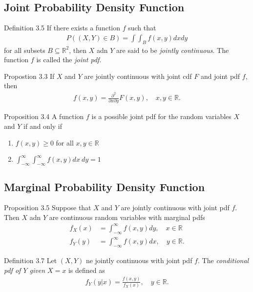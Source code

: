\subsection{Joint Probability Density Function}
\begin{boks}{Definition 3.5}
If there exists a function $f$ such that
\begin{align*}
    P((X, Y)\in B) = \int\int_B f(x, y) dx dy
\end{align*}
for all subsets $B\subseteq \mathbb{R}^2$, then $X$ adn $Y$ are said to be \textit{jointly continuous}. The function $f$ is called the \textit{joint pdf}.
\end{boks}

\begin{boks}{Propostion 3.3}
If $X$ and $Y$ are jointly continuous with joint cdf $F$ and joint pdf $f$, then
\begin{align*}
    f(x, y) = \frac{\partial^2}{\partial x \partial y} F(x,y), \quad x,y \in \mathbb{R}.
\end{align*}
\end{boks}

\begin{boks}{Proposition 3.4}
A function $f$ is a possible joint pdf for the random variables $X$ and $Y$ if and only if
\begin{enumerate}
    \item $f(x, y) \geq 0$ for all $x,y \in \mathbb{R}$
    \item $\int_{-\infty}^\infty \int_{-\infty}^\infty f(x,y)dx\  dy = 1$
\end{enumerate}
\end{boks}
\newpage
\subsection{Marginal Probability Density Function}

\begin{boks}{Proposition 3.5}
Suppose that $X$ and $Y$ are jointly continuous with joint pdf $f$. Then $X$ adn $Y$ are continuous random variables with marginal pdfs
\begin{align*}
    f_X(x) &= \int_{-\infty}^\infty f(x, y) dy, \quad x\in\mathbb{R} \\
    f_Y(y) &= \int_{-\infty}^\infty f(x,y) dx, \quad y\in\mathbb{R}.
\end{align*}
\end{boks}

\begin{boks}{Definition 3.7}
Let $(X, Y)$ ne jointly continuous with joint pdf $f$. The \textit{conditional pdf of $Y$ given $X=x$} is defined as
\begin{align*}
    f_Y(y|x) = \frac{f(x,y)}{f_X(x)}, \quad y\in\mathbb{R}.
\end{align*}
\end{boks}
\vspace{-5mm}
